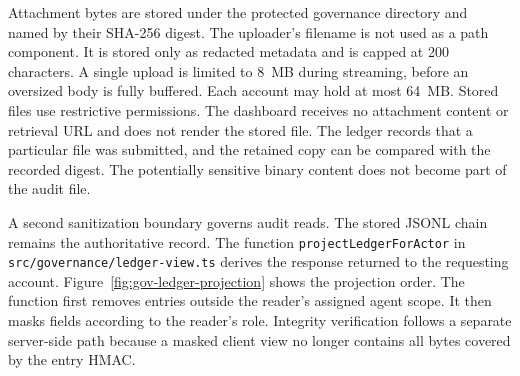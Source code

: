 Attachment bytes are stored under the protected governance directory and named by their SHA-256 digest. The uploader's filename is not used as a path component. It is stored only as redacted metadata and is capped at 200 characters. A single upload is limited to 8~MB during streaming, before an oversized body is fully buffered. Each account may hold at most 64~MB. Stored files use restrictive permissions. The dashboard receives no attachment content or retrieval URL and does not render the stored file. The ledger records that a particular file was submitted, and the retained copy can be compared with the recorded digest. The potentially sensitive binary content does not become part of the audit file.

\FloatBarrier

A second sanitization boundary governs audit reads. The stored JSONL chain remains the authoritative record. The function
\texttt{projectLedgerForActor} in
\texttt{src/\allowbreak governance/ledger-view.ts} derives the response returned to the requesting account. Figure~\ref{fig:gov-ledger-projection} shows the projection order. The function first removes entries outside the reader's assigned agent scope. It then masks fields according to the reader's role. Integrity verification follows a separate server-side path because a masked client view no longer contains all bytes covered by the entry HMAC.


